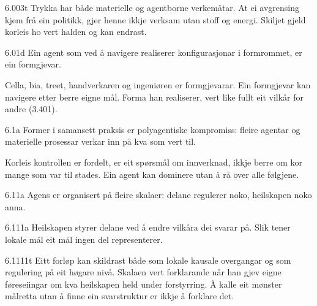 \begin{formproposition}{6.003}{t}
Trykka har både materielle og agentborne verkemåtar. At ei avgrensing kjem frå ein politikk, gjer henne ikkje verksam utan stoff og energi. Skiljet gjeld korleis ho vert halden og kan endrast.
\end{formproposition}

\begin{formproposition}{6.01}{d}
Ein agent som ved å navigere realiserer konfigurasjonar i formrommet, er ein formgjevar.

Cella, bia, treet, handverkaren og ingeniøren er formgjevarar. Ein formgjevar kan navigere etter berre eigne mål. Forma han realiserer, vert like fullt eit vilkår for andre (3.401).
\end{formproposition}























\begin{formproposition}{6.1}{a}
Former i samansett praksis er polyagentiske kompromiss: fleire agentar og materielle prosessar verkar inn på kva som vert til.

Korleis kontrollen er fordelt, er eit spørsmål om innverknad, ikkje berre om kor mange som var til stades. Ein agent kan dominere utan å rå over alle følgjene.
\end{formproposition}

\begin{formproposition}{6.11}{a}
Agens er organisert på fleire skalaer: delane regulerer noko, heilskapen noko anna.
\end{formproposition}

\begin{formproposition}{6.111}{a}
Heilskapen styrer delane ved å endre vilkåra dei svarar på. Slik tener lokale mål eit mål ingen del representerer.
\end{formproposition}

\begin{formproposition}{6.1111}{t}
Eitt forløp kan skildrast både som lokale kausale overgangar og som regulering på eit høgare nivå. Skalaen vert forklarande når han gjev eigne føreseiingar om kva heilskapen held under forstyrring. Å kalle eit mønster målretta utan å finne ein svarstruktur er ikkje å forklare det.
\end{formproposition}

